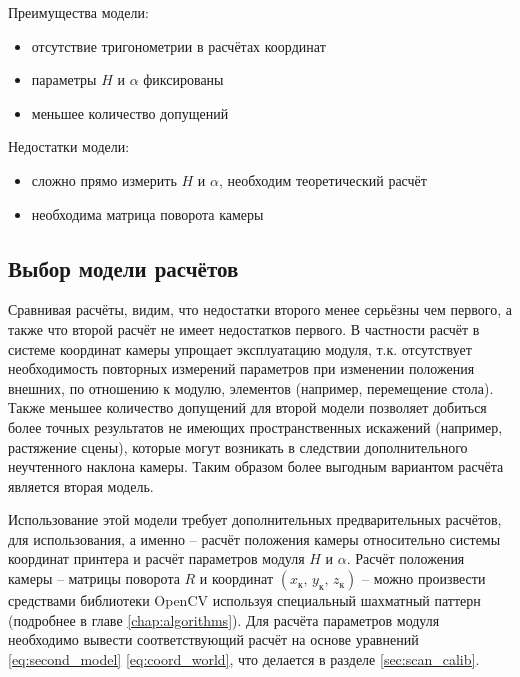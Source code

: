            Преимущества модели:
            \begin{itemize}
                \item отсутствие тригонометрии в расчётах координат
                \item параметры $ H $ и $ \alpha $ фиксированы
                \item меньшее количество допущений
            \end{itemize}
            
            Недостатки модели:
            \begin{itemize}
                \item сложно прямо измерить $ H $ и $ \alpha $, необходим теоретический расчёт
                \item необходима матрица поворота камеры
            \end{itemize}
            
        \subsection{Выбор модели расчётов}
            Сравнивая расчёты, видим, что недостатки второго менее серьёзны чем первого, а также что второй расчёт не имеет недостатков первого. В частности расчёт в системе координат камеры упрощает эксплуатацию модуля, т.к. отсутствует необходимость повторных измерений параметров при изменении положения внешних, по отношению к модулю, элементов (например, перемещение стола). Также меньшее количество допущений для второй модели позволяет добиться более точных результатов не имеющих пространственных искажений (например, растяжение сцены), которые могут возникать в следствии дополнительного неучтенного наклона камеры.
            Таким образом более выгодным вариантом расчёта является вторая модель.
            
            \sloppy Использование этой модели требует дополнительных предварительных расчётов, для использования, а именно -- расчёт положения камеры относительно системы координат принтера и расчёт параметров модуля $ H $ и $\alpha$. Расчёт положения камеры -- матрицы поворота $ R $ и координат $ \left(x_\text{к},\,y_\text{к},\,z_\text{к}\right) $ -- можно произвести средствами библиотеки OpenCV используя специальный шахматный паттерн (подробнее в главе \ref{chap:algorithms}). Для расчёта параметров модуля необходимо вывести соответствующий расчёт на основе уравнений \ref{eq:second_model} \ref{eq:coord_world}, что делается в разделе \ref{sec:scan_calib}.

